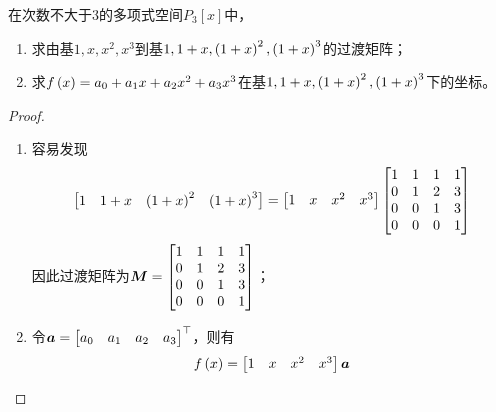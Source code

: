 \begin{problem}
在次数不大于\(3\)的多项式空间\(P_3[x]\)中，
\begin{enumerate}
    \item 求由基\(1,x,x^2,x^3\)到基\(1,1+x,\left( 1+x \right)^2,\left( 1+x \right)^3\)的过渡矩阵；
    \item 求\(f\left( x \right)=a_0+a_1x+a_2x^2+a_3x^3\)在基\(1,1+x,\left( 1+x \right)^2,\left( 1+x \right)^3\)下的坐标。
\end{enumerate}
\end{problem}
\begin{proof}
    \begin{enumerate}
        \item {
              容易发现
              \begin{equation*}
                  \begin{bmatrix}
                      1 & 1+x & \left( 1+x \right)^2 & \left( 1+x \right)^3
                  \end{bmatrix}=
                  \begin{bmatrix}
                      1 & x & x^2 & x^3
                  \end{bmatrix}
                  \begin{bmatrix}
                      1 & 1 & 1 & 1 \\
                      0 & 1 & 2 & 3 \\
                      0 & 0 & 1 & 3 \\
                      0 & 0 & 0 & 1
                  \end{bmatrix}
              \end{equation*}
              因此过渡矩阵为\(\boldsymbol{M}=
              \begin{bmatrix}
                  1 & 1 & 1 & 1 \\
                  0 & 1 & 2 & 3 \\
                  0 & 0 & 1 & 3 \\
                  0 & 0 & 0 & 1
              \end{bmatrix}\)；
              }
        \item {
              令\(\boldsymbol{a}=\begin{bmatrix}a_0&a_1&a_2&a_3\end{bmatrix}^\top\)，则有
              \begin{align*}
                  f\mypar{x}
                   & =
                  \begin{bmatrix}
                      1 & x & x^2 & x^3
                  \end{bmatrix}\veca \\

\end{align*}}
\end{enumerate}
\end{proof}
